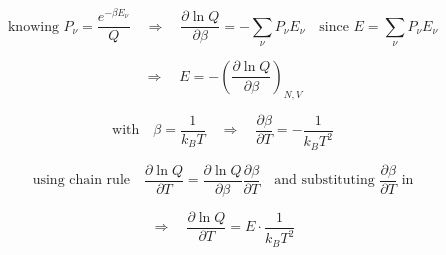 \documentclass{article}
\begin{document}
\newpage


\vspace*{0.2cm}

\begin{equation*}
\text{knowing } P_\nu = \frac{e^{-\beta E_\nu}}{Q} \quad \Rightarrow \quad \frac{\partial \ln Q}{\partial \beta} = - \sum_\nu P_\nu E_\nu \quad \text{since } E = \sum_\nu P_\nu E_\nu
\end{equation*}

\vspace{0.3cm}
\begin{equation*}
\Rightarrow \quad E = - \left( \frac{\partial \ln Q}{\partial \beta} \right)_{N,V}
\end{equation*}

\vspace{0.5cm}
\begin{equation*}
\text{with} \quad \beta = \frac{1}{k_B T} \quad \Rightarrow \quad \frac{\partial \beta}{\partial T} = - \frac{1}{k_B T^2}
\end{equation*}

\vspace{0.5cm}
\begin{equation*}
\text{using chain rule} \quad \frac{\partial \ln Q}{\partial T} = \frac{\partial \ln Q}{\partial \beta} \frac{\partial \beta}{\partial T} \quad \text{and substituting } \frac{\partial \beta}{\partial T} \text{ in}
\end{equation*}

\vspace{0.5cm}
\begin{equation*}
\Rightarrow \quad \frac{\partial \ln Q}{\partial T} = E \cdot \frac{1}{k_B T^2}
\end{equation*}


\end{document}
